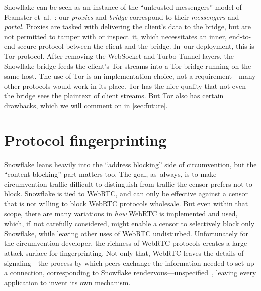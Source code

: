\documentclass[letterpaper,twocolumn]{article}
\newcommand{\firstterm}[1]{\textit{#1}}
\begin{document}
Snowflake can be seen as an instance of the
``untrusted messengers'' model of Feamster et~al.~\cite[\S 3]{Feamster2003a}:
our \firstterm{proxies} and \firstterm{bridge} correspond to their
\firstterm{messengers} and \firstterm{portal}.
Proxies are tasked with delivering the client's data to the bridge,
but are not permitted to tamper with or inspect~it,
which necessitates an inner,
end-to-end secure protocol between the client and the bridge.
In~our deployment, this is Tor protocol.
After removing the WebSocket and Turbo Tunnel layers,
the Snowflake bridge feeds the client's Tor streams
into a Tor bridge running on the same host.
The use of Tor is an implementation choice, not a requirement---many
other protocols would work in its place.
Tor has the nice quality that
not even the bridge
sees the plaintext of client streams.
But Tor also has certain drawbacks,
which we will comment on in
\autoref{sec:future}.

\section{Protocol fingerprinting}
\label{sec:fingerprinting}


Snowflake leans heavily into the ``address blocking'' side of circumvention,
but the ``content blocking'' part matters too.
The goal, as~always, is to make circumvention traffic
difficult to distinguish from traffic the censor prefers not to block.
Snowflake is tied to WebRTC,
and can only be effective against a censor
that is not willing to block WebRTC protocols wholesale.
But even within that scope,
there are many variations in \emph{how}
WebRTC is implemented and used,
which, if~not carefully considered, might enable a censor
to selectively block only Snowflake,
while leaving other uses of WebRTC undisturbed.
Unfortunately for the circumvention developer,
the richness of WebRTC protocols
creates a large attack surface for fingerprinting.
Not only that, WebRTC leaves the details of
signaling---the process by which peers exchange the information
needed to set up a connection,
corresponding to Snowflake rendezvous---unspecified~\cite[\S 3]{rfc8825},
leaving every application to invent its own mechanism.
\end{document}
